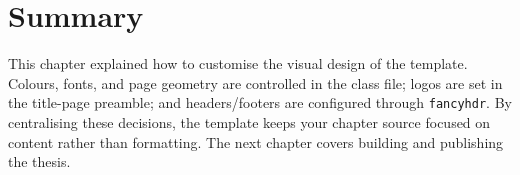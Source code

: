 \section{Summary}\label{ch4sec:custom-summary}

This chapter explained how to customise the visual design of the template. Colours, fonts, and page geometry are controlled in the class file; logos are set in the title-page preamble; and headers/footers are configured through \texttt{fancyhdr}. By centralising these decisions, the template keeps your chapter source focused on content rather than formatting. The next chapter covers building and publishing the thesis.
